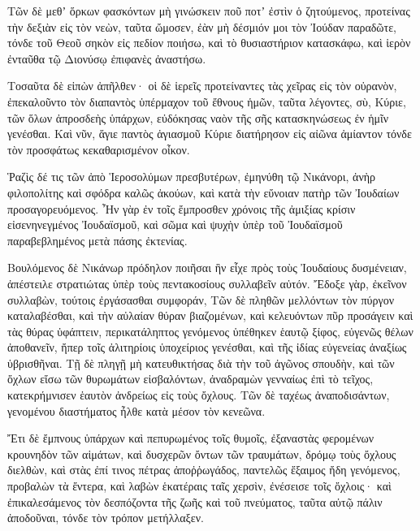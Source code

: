 {Τῶν δὲ μεθʼ ὅρκων φασκόντων μὴ γινώσκειν ποῦ ποτʼ ἐστὶν ὁ ζητούμενος,
προτείνας τὴν δεξιὰν εἰς τὸν νεὼν, ταῦτα ὤμοσεν, ἐὰν μὴ δέσμιόν μοι τὸν Ἰούδαν παραδῶτε, τόνδε τοῦ Θεοῦ σηκὸν εἰς πεδίον ποιήσω, καὶ τὸ θυσιαστήριον κατασκάφω, καὶ ἱερὸν ἐνταῦθα τῷ Διονύσῳ ἐπιφανὲς ἀναστήσω.
\par }{\PP {}Τοσαῦτα δὲ εἰπὼν ἀπῆλθεν· οἱ δὲ ἱερεῖς προτείναντες τὰς χεῖρας εἰς τὸν οὐρανὸν, ἐπεκαλοῦντο τὸν διαπαντὸς ὑπέρμαχον τοῦ ἔθνους ἡμῶν, ταῦτα λέγοντες,
σὺ, Κύριε, τῶν ὅλων ἀπροσδεὴς ὑπάρχων, εὐδόκησας ναὸν τῆς σῆς κατασκηνώσεως ἐν ἡμῖν γενέσθαι.
Καὶ νῦν, ἅγιε παντὸς ἁγιασμοῦ Κύριε διατήρησον εἰς αἰῶνα ἀμίαντον τόνδε τὸν προσφάτως κεκαθαρισμένον οἶκον.
\par }{\PP {}Ῥαζὶς δέ τις τῶν ἀπὸ Ἱεροσολύμων πρεσβυτέρων, ἐμηνύθη τῷ Νικάνορι, ἀνὴρ φιλοπολίτης καὶ σφόδρα καλῶς ἀκούων, καὶ κατὰ τὴν εὔνοιαν πατὴρ τῶν Ἰουδαίων προσαγορευόμενος.
Ἦν γὰρ ἐν τοῖς ἔμπροσθεν χρόνοις τῆς ἀμιξίας κρίσιν εἰσενηνεγμένος Ἰουδαϊσμοῦ, καὶ σῶμα καὶ ψυχὴν ὑπὲρ τοῦ Ἰουδαϊσμοῦ παραβεβλημένος μετὰ πάσης ἐκτενίας.
\par }{\PP {}Βουλόμενος δὲ Νικάνωρ πρόδηλον ποιῆσαι ἣν εἶχε πρὸς τοὺς Ἰουδαίους δυσμένειαν, ἀπέστειλε στρατιώτας ὑπὲρ τοὺς πεντακοσίους συλλαβεῖν αὐτόν.
Ἔδοξε γὰρ, ἐκεῖνον συλλαβὼν, τούτοις ἐργάσασθαι συμφοράν,
Τῶν δὲ πληθῶν μελλόντων τὸν πύργον καταλαβέσθαι, καὶ τὴν αὐλαίαν θύραν βιαζομένων, καὶ κελευόντων πῦρ προσάγειν καὶ τὰς θύρας ὑφάπτειν, περικατάληπτος γενόμενος ὑπέθηκεν ἑαυτῷ ξίφος,
εὐγενῶς θέλων ἀποθανεῖν, ἤπερ τοῖς ἀλιτηρίοις ὑποχείριος γενέσθαι, καὶ τῆς ἰδίας εὐγενείας ἀναξίως ὑβρισθῆναι.
Τῇ δὲ πληγῇ μὴ κατευθικτήσας διὰ τὴν τοῦ ἀγῶνος σπουδὴν, καὶ τῶν ὄχλων εἴσω τῶν θυρωμάτων εἰσβαλόντων, ἀναδραμὼν γενναίως ἐπὶ τὸ τεῖχος, κατεκρήμνισεν ἑαυτὸν ἀνδρείως εἰς τοὺς ὄχλους.
Τῶν δὲ ταχέως ἀναποδισάντων, γενομένου διαστήματος ἦλθε κατὰ μέσον τὸν κενεῶνα.
\par }{\PP {}Ἔτι δὲ ἔμπνους ὑπάρχων καὶ πεπυρωμένος τοῖς θυμοῖς, ἐξαναστὰς φερομένων κρουνηδὸν τῶν αἱμάτων, καὶ δυσχερῶν ὄντων τῶν τραυμάτων, δρόμῳ τοὺς ὄχλους διελθὼν, καὶ στὰς ἐπί τινος πέτρας ἀποῤῥωγάδος,
παντελῶς ἔξαιμος ἤδη γενόμενος, προβαλὼν τὰ ἔντερα, καὶ λαβὼν ἑκατέραις ταῖς χερσὶν, ἐνέσεισε τοῖς ὄχλοις· καὶ ἐπικαλεσάμενος τὸν δεσπόζοντα τῆς ζωῆς καὶ τοῦ πνεύματος, ταῦτα αὐτῷ πάλιν ἀποδοῦναι, τόνδε τὸν τρόπον μετήλλαξεν.

}

